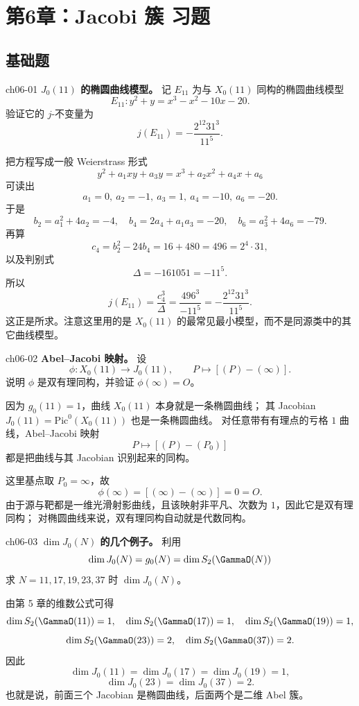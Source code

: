 \chapter{第6章：Jacobi 簇 习题}
\difficultykey

\section{基础题 \easy}

\begin{problem}{ch06-01}
\textbf{$J_0(11)$ 的椭圆曲线模型。}
记 $E_{11}$ 为与 $X_0(11)$ 同构的椭圆曲线模型
\[
E_{11}: y^2+y=x^3-x^2-10x-20.
\]
验证它的 $j$-不变量为
\[
j(E_{11})=-\frac{2^{12}31^3}{11^5}.
\]
\end{problem}
\begin{solution}
把方程写成一般 Weierstrass 形式
\[
y^2+a_1xy+a_3y=x^3+a_2x^2+a_4x+a_6
\]
可读出
\[
a_1=0,\ a_2=-1,\ a_3=1,\ a_4=-10,\ a_6=-20.
\]
于是
\[
b_2=a_1^2+4a_2=-4,
\quad
b_4=2a_4+a_1a_3=-20,
\quad
b_6=a_3^2+4a_6=-79.
\]
再算
\[
c_4=b_2^2-24b_4=16+480=496=2^4\cdot 31,
\]
以及判别式
\[
\Delta=-161051=-11^5.
\]
所以
\[
j(E_{11})=\frac{c_4^3}{\Delta}=\frac{496^3}{-11^5}
=-\frac{2^{12}31^3}{11^5}.
\]
这正是所求。注意这里用的是 $X_0(11)$ 的最常见最小模型，而不是同源类中的其它曲线模型。
\end{solution}

\begin{problem}{ch06-02}
\textbf{Abel--Jacobi 映射。}
设
\[
\phi:X_0(11)\to J_0(11),\qquad P\mapsto [(P)-(\infty)].
\]
说明 $\phi$ 是双有理同构，并验证 $\phi(\infty)=O$。
\end{problem}
\begin{solution}
因为 $g_0(11)=1$，曲线 $X_0(11)$ 本身就是一条椭圆曲线；
其 Jacobian $J_0(11)=\mathrm{Pic}^0(X_0(11))$ 也是一条椭圆曲线。
对任意带有有理点的亏格 $1$ 曲线，Abel--Jacobi 映射
\[
P\longmapsto [(P)-(P_0)]
\]
都是把曲线与其 Jacobian 识别起来的同构。

这里基点取 $P_0=\infty$，故
\[
\phi(\infty)=[(\infty)-(\infty)]=0=O.
\]
由于源与靶都是一维光滑射影曲线，且该映射非平凡、次数为 $1$，因此它是双有理同构；
对椭圆曲线来说，双有理同构自动就是代数同构。
\end{solution}

\begin{problem}{ch06-03}
\textbf{$\dim J_0(N)$ 的几个例子。}
利用
\[
\dim J_0(N)=g_0(N)=\dim S_2(\GammaO(N))
\]
求 $N=11,17,19,23,37$ 时 $\dim J_0(N)$。
\end{problem}
\begin{solution}
由第 5 章的维数公式可得
\[
\dim S_2(\GammaO(11))=1,
\quad
\dim S_2(\GammaO(17))=1,
\quad
\dim S_2(\GammaO(19))=1,
\]
\[
\dim S_2(\GammaO(23))=2,
\quad
\dim S_2(\GammaO(37))=2.
\]
因此
\[
\dim J_0(11)=\dim J_0(17)=\dim J_0(19)=1,
\]
\[
\dim J_0(23)=\dim J_0(37)=2.
\]
也就是说，前面三个 Jacobian 是椭圆曲线，后面两个是二维 Abel 簇。
\end{solution}

